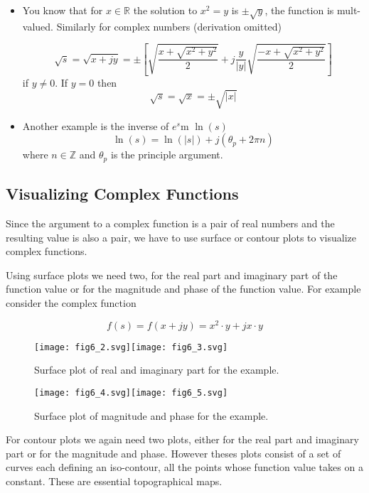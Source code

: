 \documentclass{article}
\begin{document}
\begin{itemize}
\item You know that for $x\in\mathbb{R}$ the solution to $x^2 = y$ is $\pm \sqrt{y}$, the function is mult-valued. Similarly for complex numbers (derivation omitted)

  \[
  \sqrt{s} = \sqrt{x + jy} = \pm \left[\sqrt{\frac{x + \sqrt{x^2 + y^2}}{2}} + j\frac{y}{|y|} \sqrt{\frac{-x + \sqrt{x^2 + y^2}}{2}}\right] 
  \]
  if $y \neq 0$. If $y = 0$ then
  \[
  \sqrt{s} = \sqrt{x} = \pm \sqrt{|x|}
  \]
  
\item Another example is the inverse of $e^s$m $\ln(s)$
  \[
  \ln(s) = \ln(|s|) + j(\theta_p + 2\pi n)  
  \]
  where $n\in\mathbb{Z}$ and $\theta_p$ is the principle argument.
\end{itemize}

\subsection{Visualizing Complex Functions}

Since the argument to a complex function is a pair of real numbers and the resulting value is also a pair, we have to use surface or contour plots to visualize complex functions.

Using surface plots we need two, for the real part and imaginary part of the function value or for the magnitude and phase of the function value. For example consider the complex function

\[
f(s) = f(x + jy) = x^2\cdot y + jx\cdot y
\]

\begin{figure}
  \centering
  \texttt{[image: fig6\_2.svg]}\texttt{[image: fig6\_3.svg]}
  \caption{Surface plot of real and imaginary part for the example.}
\end{figure}

\begin{figure}
  \centering
  \texttt{[image: fig6\_4.svg]}\texttt{[image: fig6\_5.svg]}
  \caption{Surface plot of magnitude and phase for the example.}
\end{figure}

For contour plots we again need two plots, either for the real part and imaginary part or for the magnitude and phase. However theses plots consist of a set of curves each defining an iso-contour, all the points whose function value takes on a constant. These are essential topographical maps.
\end{document}
